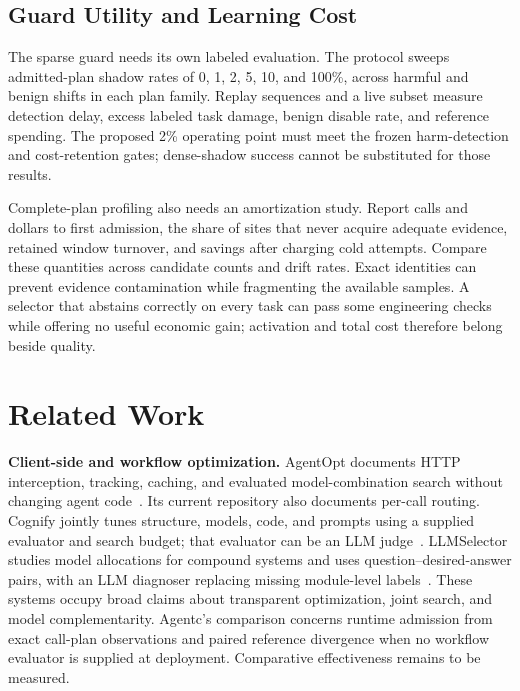 \subsection{Guard Utility and Learning Cost}

The sparse guard needs its own labeled evaluation. The protocol sweeps admitted-plan
shadow rates of 0, 1, 2, 5, 10, and 100\%, across harmful and benign shifts in each
plan family. Replay sequences and a live subset measure detection delay, excess
labeled task damage, benign disable rate, and reference spending. The proposed 2\%
operating point must meet the frozen harm-detection and cost-retention gates;
dense-shadow success cannot be substituted for those results.

Complete-plan profiling also needs an amortization study. Report calls and dollars
to first admission, the share of sites that never acquire adequate evidence, retained
window turnover, and savings after charging cold attempts. Compare these quantities
across candidate counts and drift rates. Exact identities can prevent evidence
contamination while fragmenting the available samples. A selector that abstains
correctly on every task can pass some engineering checks while offering no useful
economic gain; activation and total cost therefore belong beside quality.

\section{Related Work}
\label{sec:related}

\textbf{Client-side and workflow optimization.}
AgentOpt documents HTTP interception, tracking, caching, and evaluated model-combination
search without changing agent code~\cite{hua2026agentopt}. Its current repository
also documents per-call routing. Cognify jointly tunes structure, models, code, and
prompts using a supplied evaluator and search budget; that evaluator can be an LLM
judge~\cite{he2025cognify}. LLMSelector studies model allocations for compound
systems and uses question--desired-answer pairs, with an LLM diagnoser replacing
missing module-level labels~\cite{chen2025llmselector}. These systems occupy broad
claims about transparent optimization, joint search, and model complementarity.
Agentc's comparison concerns runtime admission from exact call-plan observations
and paired reference divergence when no workflow evaluator is supplied at deployment.
Comparative effectiveness remains to be measured.

